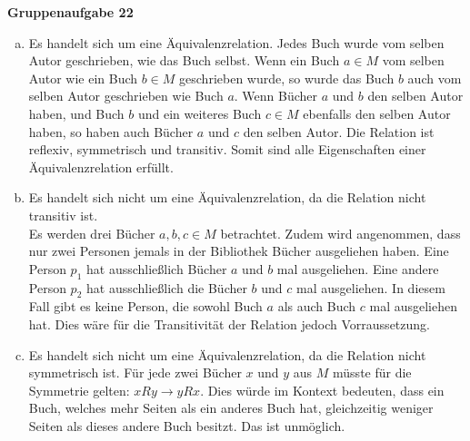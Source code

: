 \documentclass[11pt, a4paper]{article}
\newcommand{\aufgabe}[1]{{\center\large\bfseries Gruppenaufgabe #1 \\}}
\begin{document}
\aufgabe{22}
\begin{enumerate}[a)]
	\item Es handelt sich um eine Äquivalenzrelation. Jedes Buch wurde vom selben Autor geschrieben, wie das Buch selbst. Wenn ein Buch $a \in M$ vom selben Autor wie ein Buch $b \in M$ geschrieben wurde, so wurde das Buch $b$ auch vom selben Autor geschrieben wie Buch $a$. Wenn Bücher $a$ und $b$ den selben Autor haben, und Buch $b$ und ein weiteres Buch $c \in M$ ebenfalls den selben Autor haben, so haben auch Bücher $a$ und $c$ den selben Autor. Die Relation ist reflexiv, symmetrisch und transitiv. Somit sind alle Eigenschaften einer Äquivalenzrelation erfüllt.
	\item Es handelt sich nicht um eine Äquivalenzrelation, da die Relation nicht transitiv ist.\\ Es werden drei Bücher $a, b, c \in M$ betrachtet. Zudem wird angenommen, dass nur zwei Personen jemals in der Bibliothek Bücher ausgeliehen haben. Eine Person $p_1$ hat ausschließlich Bücher $a$ und $b$ mal ausgeliehen. Eine andere Person $p_2$ hat ausschließlich die Bücher $b$ und $c$ mal ausgeliehen. In diesem Fall gibt es keine Person, die sowohl Buch $a$ als auch Buch $c$ mal ausgeliehen hat. Dies wäre für die Transitivität der Relation jedoch Vorraussetzung.
	\item Es handelt sich nicht um eine Äquivalenzrelation, da die Relation nicht symmetrisch ist. Für jede zwei Bücher $x$ und $y$ aus $M$ müsste für die Symmetrie gelten: $xRy \rightarrow yRx$. Dies würde im Kontext bedeuten, dass ein Buch, welches mehr Seiten als ein anderes Buch hat, gleichzeitig weniger Seiten als dieses andere Buch besitzt. Das ist unmöglich.
\end{enumerate}
\end{document}
